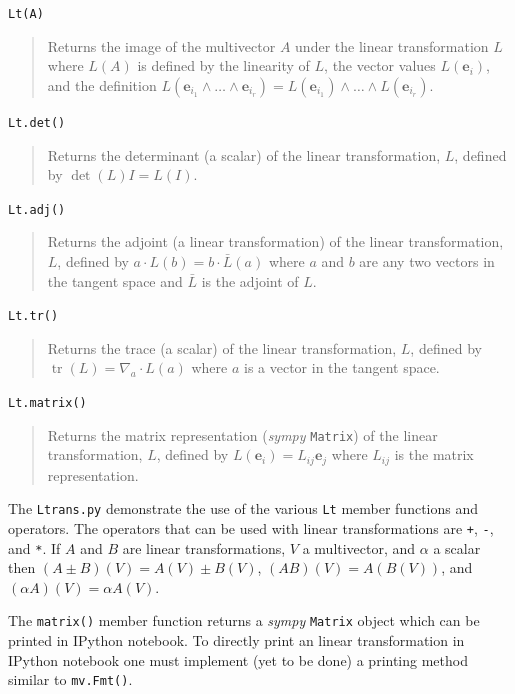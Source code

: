 \documentclass[12pt]{report}
\newcommand{\bm}[1]{\boldsymbol{#1}}
\newcommand{\ebf}{\bm{e}}
\newcommand{\lp}{\left (}
\newcommand{\rp}{\right )}
\newcommand{\W}{\wedge}
\newcommand{\f}[2]{{#1}\lp {#2} \rp}
\newcommand{\paren}[1]{\lp {#1} \rp}
\newcommand{\T}[1]{\texttt{#1}}
\begin{document}
\T{Lt(A)}
\begin{quote}
	Returns the image of the multivector $A$ under the linear transformation $L$ where $\f{L}{A}$ is defined by the
	linearity of $L$, the vector values $\f{L}{\ebf_{i}}$, and the definition
	$\f{L}{\ebf_{i_{1}}\W\dots\W\ebf_{i_{r}}} = \f{L}{\ebf_{i_{1}}}\W\dots\W\f{L}{\ebf_{i_{r}}}$. 
\end{quote}
\T{Lt.det()}
\begin{quote}
	Returns the determinant (a scalar) of the linear transformation, $L$, defined by $\f{\det}{L}I = \f{L}{I}$.
\end{quote}
\T{Lt.adj()}
\begin{quote}
	Returns the adjoint (a linear transformation) of the linear transformation, $L$, defined by $a\cdot\f{L}{b} = b\cdot\f{\bar{L}}{a}$ where
	$a$ and $b$ are any two vectors in the tangent space and $\bar{L}$ is the adjoint of $L$.
\end{quote}
\T{Lt.tr()}
\begin{quote}
	Returns the trace (a scalar) of the linear transformation, $L$, defined by 
	$\f{\operatorname{tr}}{L}=\nabla_{a}\cdot\f{L}{a}$ where $a$ is a vector in the tangent space.
\end{quote}
\T{Lt.matrix()}
\begin{quote}
	Returns the matrix representation (\emph{sympy} \T{Matrix}) of the linear transformation, $L$, defined by 
	$\f{L}{\ebf_{i}} = L_{ij}\ebf_{j}$ where $L_{ij}$ is the matrix representation.
\end{quote}
The \T{Ltrans.py} demonstrate the use of the various \T{Lt} member functions and operators. The operators that can be used with
linear transformations are \T{+}, \T{-}, and \T{*}. If $A$ and $B$ are linear transformations, $V$ a multivector, and $\alpha$ a 
scalar then $\f{\paren{A\pm B}}{V} = \f{A}{V}\pm\f{B}{V}$, $\f{\paren{AB}}{V} = \f{A}{\f{B}{V}}$, and 
$\f{\paren{\alpha A}}{V} = \alpha\f{A}{V}$.

The \T{matrix()} member function returns a \emph{sympy} \T{Matrix} object which can be printed in IPython notebook.  To directly print 
an linear transformation in IPython notebook one must implement (yet to be done) a printing method similar to \T{mv.Fmt()}.
\end{document}
